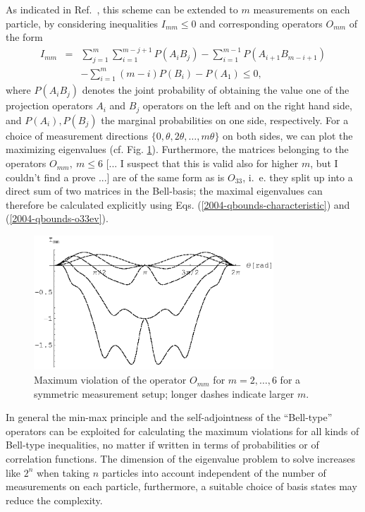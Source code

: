 \documentclass[prl,showpacs,showkeys,amsfonts,amsmath,twocolumn]{revtex4}
\begin{document}
As indicated in Ref.~\cite{collins-gisin-2003}, this scheme can be extended to $m$
measurements on each particle, by considering inequalities $I_{mm}
\leq 0$ and
corresponding operators $O_{mm}$ of the form
\begin{eqnarray}
  I_{mm}&=& \sum_{j=1}^{m}\sum_{i=1}^{m-j+1}P({A_i B_j})-\sum_{i=1}^{m-1}
  P({A_{i+1}B_{m-i+1}}) \nonumber\\
  &&-\sum_{i=1}^{m}(m-i)P(B_{i}) - P(A_1) \leq 0,
\end{eqnarray}
where $P(A_i B_j)$ denotes the joint probability of obtaining the value one of the
projection operators $A_i$ and $B_j$ operators on the left and on the
right hand side, and $P(A_i), P(B_j)$ the marginal probabilities on
one side, respectively.
For a choice of measurement directions
$\{0,\theta,2\theta,\ldots,m\theta\}$ on both sides, we can plot the
maximizing eigenvalues
(cf. Fig. \ref{fig:2004-qbounds-f2}). Furthermore, the matrices belonging to the operators $O_{mm},\ m \leq
6$ [... I suspect that this is valid also for higher $m$, but I
couldn't find a prove ...] are of the same form
as is $O_{33}$, i.~e. they
split up into a direct sum of two matrices in the
Bell-basis; the maximal eigenvalues can therefore be  calculated
explicitly using Eqs. (\ref{2004-qbounds-characteristic}) and (\ref{2004-qbounds-o33ev}).
\begin{figure}[htbp]
  \centering
  \includegraphics[width=90mm]{2004-qbounds-f2}
  \caption{Maximum violation of the operator $O_{mm}$ for
    $m=2,\ldots,6$ for a symmetric measurement setup; longer dashes indicate larger $m$.}
  \label{fig:2004-qbounds-f2}
\end{figure}


In general the min-max principle and the self-adjointness of the
``Bell-type'' operators can be
exploited for calculating the maximum violations for all kinds of
Bell-type inequalities, no matter if written in terms of probabilities
or of correlation functions. The dimension of the eigenvalue problem
to solve increases like $2^n$ when taking $n$ particles into
account independent of the number of measurements on each particle,
furthermore, a suitable choice of
basis states may reduce the complexity.
\end{document}
